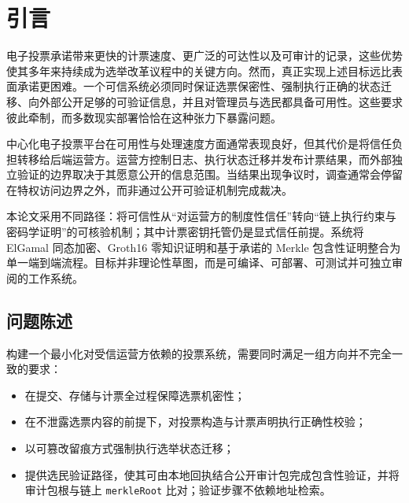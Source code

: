 ﻿\chapter{引言}
\begingroup
\justifying
\setlength{\parindent}{0pt}
\setlength{\parskip}{0.5\baselineskip}
\titlespacing{\chapter}{0pt}{0pt}{0pt}
\titlespacing{\section}{0pt}{0pt}{0pt}

电子投票承诺带来更快的计票速度、更广泛的可达性以及可审计的记录，这些优势使其多年来持续成为选举改革议程中的关键方向。然而，真正实现上述目标远比表面承诺更困难。一个可信系统必须同时保证选票保密性、强制执行正确的状态迁移、向外部公开足够的可验证信息，并且对管理员与选民都具备可用性。这些要求彼此牵制，而多数现实部署恰恰在这种张力下暴露问题。

中心化电子投票平台在可用性与处理速度方面通常表现良好，但其代价是将信任负担转移给后端运营方。运营方控制日志、执行状态迁移并发布计票结果，而外部独立验证的边界取决于其愿意公开的信息范围。当结果出现争议时，调查通常会停留在特权访问边界之外，而非通过公开可验证机制完成裁决。

本论文采用不同路径：将可信性从“对运营方的制度性信任”转向“链上执行约束与密码学证明”的可核验机制；其中计票密钥托管仍是显式信任前提。系统将 ElGamal 同态加密、Groth16 零知识证明和基于承诺的 Merkle 包含性证明整合为单一端到端流程。目标并非理论性草图，而是可编译、可部署、可测试并可独立审阅的工作系统。

\section{问题陈述}

构建一个最小化对受信运营方依赖的投票系统，需要同时满足一组方向并不完全一致的要求：
\begin{itemize}
    \item 在提交、存储与计票全过程保障选票机密性；
    \item 在不泄露选票内容的前提下，对投票构造与计票声明执行正确性校验；
    \item 以可篡改留痕方式强制执行选举状态迁移；
    \item 提供选民验证路径，使其可由本地回执结合公开审计包完成包含性验证，并将审计包根与链上 \texttt{merkleRoot} 比对；验证步骤不依赖地址检索。
\end{itemize}

